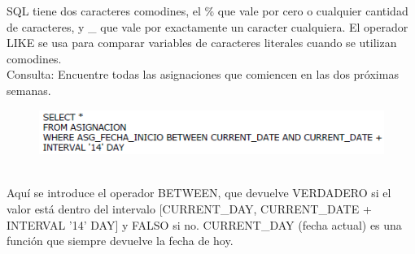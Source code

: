 \documentclass[preprint,12pt]{elsarticle}
\begin{document}
\begin{itemize}
SQL tiene dos caracteres comodines, el \%  que vale por cero o cualquier cantidad de caracteres, y \_ que vale por exactamente un caracter cualquiera. El operador LIKE se usa para comparar variables de caracteres literales cuando se utilizan comodines. \\ Consulta: Encuentre todas las asignaciones que comiencen en las dos próximas semanas.
	\begin{figure}[htb]
		\begin{center}
			\includegraphics[width=12cm]{./IMAGENES/consultasimple6}
		\end{center}
	\end{figure}
\\ Aquí se introduce el operador BETWEEN, que devuelve VERDADERO si el valor está dentro del intervalo [CURRENT\_DAY, CURRENT\_DATE + INTERVAL '14' DAY] y FALSO si no. CURRENT\_DAY (fecha actual) es una función que siempre devuelve la fecha de hoy.\\


\end{itemize}
\end{document}
